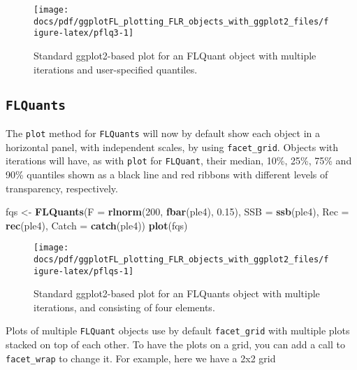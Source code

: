 \documentclass[]{article}
\newenvironment{Shaded}{\begin{snugshade}}{\end{snugshade}}
\newcommand{\KeywordTok}[1]{\textcolor[rgb]{0.13,0.29,0.53}{\textbf{{#1}}}}
\newcommand{\DataTypeTok}[1]{\textcolor[rgb]{0.13,0.29,0.53}{{#1}}}
\newcommand{\DecValTok}[1]{\textcolor[rgb]{0.00,0.00,0.81}{{#1}}}
\newcommand{\FloatTok}[1]{\textcolor[rgb]{0.00,0.00,0.81}{{#1}}}
\newcommand{\StringTok}[1]{\textcolor[rgb]{0.31,0.60,0.02}{{#1}}}
\newcommand{\NormalTok}[1]{{#1}}
\begin{document}
\begin{figure}

{\centering \texttt{[image: docs/pdf/ggplotFL\_plotting\_FLR\_objects\_with\_ggplot2\_files/figure-latex/pflq3-1]} 

}

\caption{Standard ggplot2-based plot for an FLQuant object with multiple iterations and user-specified quantiles.}\label{fig:pflq3}
\end{figure}

\subsection{\texorpdfstring{\texttt{FLQuants}}{FLQuants}}\label{flquants-1}

The \texttt{plot} method for \texttt{FLQuants} will now by default show
each object in a horizontal panel, with independent scales, by using
\texttt{facet\_grid}. Objects with iterations will have, as with
\texttt{plot} for \texttt{FLQuant}, their median, 10\%, 25\%, 75\% and
90\% quantiles shown as a black line and red ribbons with different
levels of transparency, respectively.

\begin{Shaded}
\begin{Highlighting}[]
\NormalTok{fqs <-}\StringTok{ }\KeywordTok{FLQuants}\NormalTok{(}\DataTypeTok{F =} \KeywordTok{rlnorm}\NormalTok{(}\DecValTok{200}\NormalTok{, }\KeywordTok{fbar}\NormalTok{(ple4), }\FloatTok{0.15}\NormalTok{), }\DataTypeTok{SSB =} \KeywordTok{ssb}\NormalTok{(ple4), }\DataTypeTok{Rec =} \KeywordTok{rec}\NormalTok{(ple4), }\DataTypeTok{Catch =} \KeywordTok{catch}\NormalTok{(ple4))}
\KeywordTok{plot}\NormalTok{(fqs)}
\end{Highlighting}
\end{Shaded}

\begin{figure}

{\centering \texttt{[image: docs/pdf/ggplotFL\_plotting\_FLR\_objects\_with\_ggplot2\_files/figure-latex/pflqs-1]} 

}

\caption{Standard ggplot2-based plot for an FLQuants object with multiple iterations, and consisting of four elements.}\label{fig:pflqs}
\end{figure}

Plots of multiple \texttt{FLQuant} objects use by default
\texttt{facet\_grid} with multiple plots stacked on top of each other.
To have the plots on a grid, you can add a call to \texttt{facet\_wrap}
to change it. For example, here we have a 2x2 grid
\end{document}
